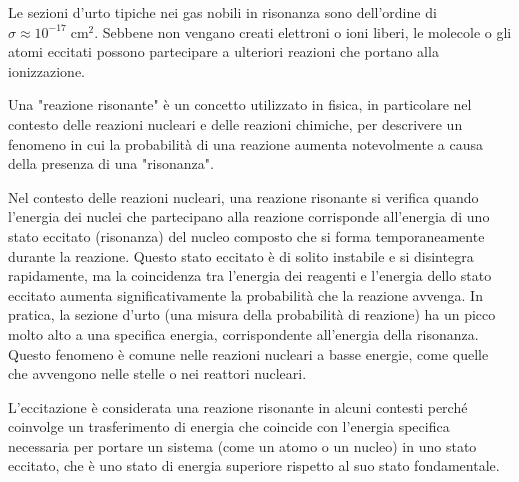 Le sezioni d'urto tipiche nei gas nobili in risonanza sono dell'ordine di $\sigma \approx 10^{-17} \; \text{cm}^2$. Sebbene non vengano creati elettroni o ioni liberi, le molecole o gli atomi eccitati possono partecipare a ulteriori reazioni che portano alla ionizzazione.

\begin{approfondimento}
   \footnotesize
   Una "reazione risonante" è un concetto utilizzato in fisica, in particolare nel contesto delle reazioni nucleari e delle reazioni chimiche, per descrivere un fenomeno in cui la probabilità di una reazione aumenta notevolmente a causa della presenza di una "risonanza".
   
   Nel contesto delle reazioni nucleari, una reazione risonante si verifica quando l'energia dei nuclei che partecipano alla reazione corrisponde all'energia di uno stato eccitato (risonanza) del nucleo composto che si forma temporaneamente durante la reazione. Questo stato eccitato è di solito instabile e si disintegra rapidamente, ma la coincidenza tra l'energia dei reagenti e l'energia dello stato eccitato aumenta significativamente la probabilità che la reazione avvenga. In pratica, la sezione d'urto (una misura della probabilità di reazione) ha un picco molto alto a una specifica energia, corrispondente all'energia della risonanza. Questo fenomeno è comune nelle reazioni nucleari a basse energie, come quelle che avvengono nelle stelle o nei reattori nucleari.

   L'eccitazione è considerata una reazione risonante in alcuni contesti perché coinvolge un trasferimento di energia che coincide con l'energia specifica necessaria per portare un sistema (come un atomo o un nucleo) in uno stato eccitato, che è uno stato di energia superiore rispetto al suo stato fondamentale.


\end{approfondimento}
